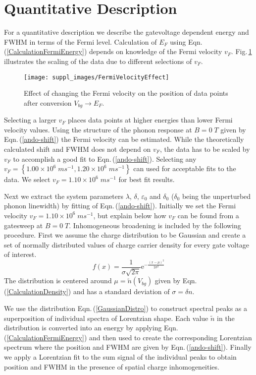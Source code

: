 \documentclass[pra,aps,superscriptaddress,preprint]{revtex4-1}
\begin{document}
\section{Quantitative Description}
\label{Quant-Descr}
For a quantitative description we describe the gatevoltage dependent energy and FWHM in terms of the Fermi level. Calculation of $E_F$ using Eqn.\,(\ref{CalculationFermiEnergy}) depends on knowledge of the Fermi velocity $v_F$. Fig.\,\ref{FermiVelocityEffect} illustrates the scaling of the data due to different selections of $v_F$.
\begin{figure}[h]
   \texttt{[image: suppl\_images/FermiVelocityEffect]}
   \caption{\label{FermiVelocityEffect}Effect of changing the Fermi velocity on the position of data points after conversion $V_{bg}\rightarrow E_F$.}
\end{figure}
Selecting a larger $v_F$ places data points at higher energies than lower Fermi velocity values. Using the structure of the phonon response at $B=0\; T$ given by Eqn.\,(\ref{ando-shift}) the Fermi velocity can be estimated. While the theoretically calculated shift and FWHM does not depend on $v_F$, the data has to be scaled by $v_F$ to accomplish a good fit to Eqn.\,(\ref{ando-shift}). 
Selecting any $v_F = \left\lbrace 1.00\times 10^6 \; ms^{-1}, 1.20\times 10^6 \; ms^{-1} \right\rbrace$ can used for acceptable fits to the data. We select $v_F=1.10\times  10^6 \; ms^{-1}$ for best fit results. 

Next we extract the system parameters $\lambda$, $\delta$, $\varepsilon_0$ and $\delta_0$ ($\delta_0$ being the unperturbed phonon linewidth) by fitting of Eqn.\,(\ref{ando-shift}). Initially we set the Fermi velocity $v_F=1.10\times 10^6 \; ms^{-1}$, but explain below how $v_F$ can be found from a gatesweep at $B=0\; T$. Inhomogeneous broadening is included by the following procedure. First we assume the charge distribution to be Gaussian and create a set of normally distributed values of charge carrier density for every gate voltage of interest.
\begin{equation}
\label{GaussianDistro}
f(x) = \frac{1}{\sigma \sqrt{2\pi}}\mathrm{e}^{-\frac{\left(x-\mu\right)^2}{2\sigma^2}}
\end{equation}
The distribution is centered around $\mu = \widetilde{n}(V_{bg})$ given by Eqn.\,(\ref{CalculationDensity}) and has a standard deviation of $\sigma = \delta n$. 

We use the distribution Eqn.\,(\ref{GaussianDistro}) to construct spectral peaks as a superposition of individual spectra of Lorentzian shape. Each value $\widetilde{n}$ in the distribution is converted into an energy by applying Eqn.\,(\ref{CalculationFermiEnergy}) and then used to create the corresponding Lorentzian spectrum where the position and FWHM are given by Eqn.\,(\ref{ando-shift}). 
Finally we apply a Lorentzian fit to the sum signal of the individual peaks to obtain position and FWHM in the presence of spatial charge inhomogeneities.
\end{document}
